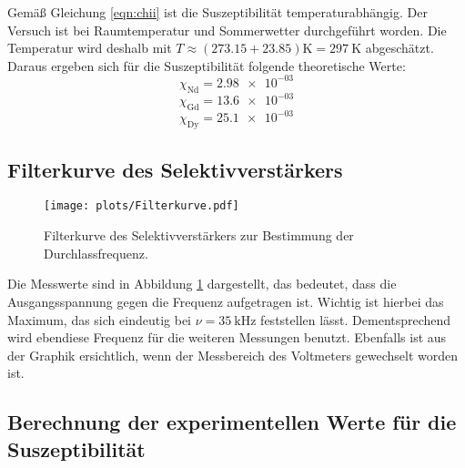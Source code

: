     Gemäß Gleichung \eqref{eqn:chii} ist die Suszeptibilität temperaturabhängig. 
    Der Versuch ist bei Raumtemperatur und Sommerwetter durchgeführt worden. 
    Die Temperatur wird deshalb mit ${T\approx(\num{273.15}+\num{23.85})\si{\kelvin}=\SI{297}{\kelvin}}$ abgeschätzt.
    Daraus ergeben sich für die Suszeptibilität folgende theoretische Werte:
    \begin{equation}
        \chi _\text{Nd}=\num{2.98e-03} 
        \label{eqn:chi1}
    \end{equation}
    \begin{equation}
        \chi _\text{Gd}=\num{13.6e-03} 
    \end{equation}
    \begin{equation}
        \chi _\text{Dy}=\num{25.1e-03} 
        \label{eqn:chi3}
    \end{equation}

\subsection{Filterkurve des Selektivverstärkers}

    \begin{figure}
        \centering
        \texttt{[image: plots/Filterkurve.pdf]}
        \caption{Filterkurve des Selektivverstärkers zur Bestimmung der Durchlassfrequenz.}
        \label{fig:Filterkurve}
    \end{figure}

    Die Messwerte sind in Abbildung \ref{fig:Filterkurve} dargestellt, das bedeutet, dass die Ausgangsspannung gegen die Frequenz aufgetragen ist. 
    Wichtig ist hierbei das Maximum, das sich eindeutig bei $\nu=\SI{35}{\kilo\hertz}$ feststellen lässt. 
    Dementsprechend wird ebendiese Frequenz für die weiteren Messungen benutzt. 
    Ebenfalls ist aus der Graphik ersichtlich, wenn der Messbereich des Voltmeters gewechselt worden ist. 

\subsection{Berechnung der experimentellen Werte für die Suszeptibilität}

